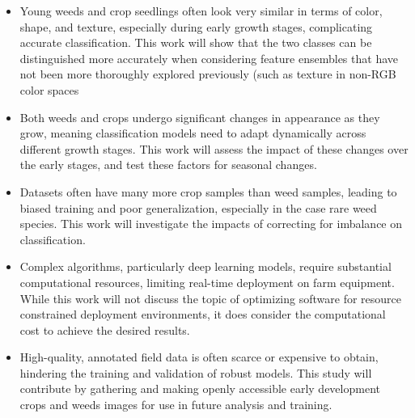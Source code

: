 \documentclass[letterpaper, notitlepage]{report}
\begin{document}
\begin{itemize}

\item{Young weeds and crop seedlings often look very similar in terms of color, shape, and texture, especially during early growth stages, complicating accurate classification. This work will show that the two classes can be distinguished more accurately when considering feature ensembles  that have not been more thoroughly explored previously (such as texture in non-RGB color spaces}

\item{Both weeds and crops undergo significant changes in appearance as they grow, meaning classification models need to adapt dynamically across different growth stages. This work will assess the impact of these changes over the early stages, and test these factors for seasonal changes.}

\item{Datasets often have many more crop samples than weed samples, leading to biased training and poor generalization, especially in the case  rare weed species. This work will investigate the impacts of correcting for imbalance on classification.}

\item{Complex algorithms, particularly deep learning models, require substantial computational resources, limiting real-time deployment on farm equipment. While this work will not discuss the topic of optimizing software for resource constrained deployment environments, it does consider the computational cost to achieve the desired results.}

\item{High-quality, annotated field data is often scarce or expensive to obtain, hindering the training and validation of robust models. This  study will contribute  by gathering and making openly accessible early development crops and weeds images for use in future analysis and training.}

\end{itemize}
\end{document}
